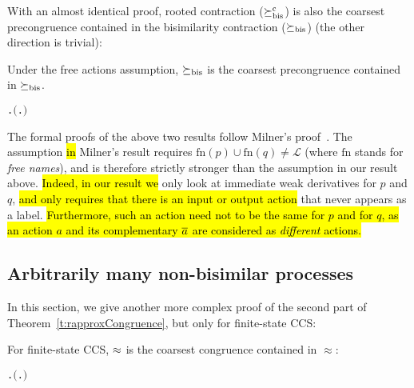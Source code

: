 With an almost identical proof, rooted contraction
($\mathrel{\succeq^{\rm{c}}_{\rm{bis}}}$) is also the coarsest
precongruence contained in the bisimilarity contraction ($\mathrel{\succeq_{\rm{bis}}}$)
(the other direction is trivial):
\begin{theorem}
  Under the free actions assumption, $\mathrel{\succeq_{\rm{bis}}}$ is the coarsest precongruence contained in $\mathrel{\succeq_{\rm{bis}}}$.
\begin{alltt}
\HOLTokenTurnstile{} \HOLSymConst{\HOLTokenForall{}} .   \HOLSymConst{\HOLTokenConj{}}   \HOLSymConst{\HOLTokenImp{}} \ensuremath{(}\HOLSymConst{\HOLTokenForall{}}.  \HOLSymConst{\ensuremath{+}}  \HOLSymConst{\HOLTokenContracts{}}  \HOLSymConst{\ensuremath{+}} \ensuremath{)} \HOLSymConst{\HOLTokenImp{}}  \HOLSymConst{\HOLTokenObsContracts} 
\end{alltt}
\end{theorem}

The formal proofs  of the above two results follow Milner's proof~\cite{Mil89}.
The assumption \hl{in} Milner's result 
requires $\mathrm{fn}(p) \cup
\mathrm{fn}(q) \neq \mathscr{L}$ (where $\mathrm{fn}$ stands for \emph{free
  names}), and is therefore strictly stronger than the assumption in
our result above. \hl{Indeed, in our result we} only look at immediate weak
derivatives for $p$ and $q$, \hl{and only requires that there is an input
or output action}
that never appears as a label. \hl{Furthermore, such an action need
not to be the same for $p$ and for $q$,
as an action $a$ and its complementary $\overline{a}$ are
considered as \emph{different} actions.}

\subsection{Arbitrarily many non-bisimilar processes}
\label{ss:arbitrarily}

In this section, we give another more complex proof of the second part
of Theorem~\ref{t:rapproxCongruence}, but only for finite-state CCS:
\begin{theorem}
    \label{thm:coarsestfiniteState}
    For finite-state CCS, $\approx$ is the coarsest congruence contained in $\approx$:
\begin{alltt}
\HOLTokenTurnstile{} \HOLSymConst{\HOLTokenForall{}} .   \HOLSymConst{\HOLTokenConj{}}   \HOLSymConst{\HOLTokenImp{}} \ensuremath{(} \HOLSymConst{\HOLTokenObsCongr}  \HOLSymConst{\HOLTokenEquiv{}} \HOLSymConst{\HOLTokenForall{}}.  \HOLSymConst{\ensuremath{+}}  \HOLSymConst{\HOLTokenWeakEQ}  \HOLSymConst{\ensuremath{+}} \ensuremath{)}
\end{alltt}
\end{theorem}

